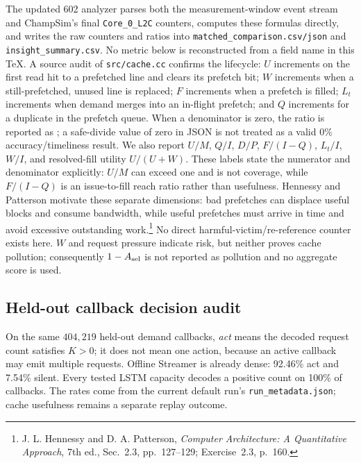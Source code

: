 \documentclass[10pt]{article}
\newcommand{\NA}{\textemdash}
\begin{document}
\begin{infobox}[title={\bfseries Exact interpretation boundaries}]
The updated 602 analyzer parses both the measurement-window event stream and
ChampSim's final \texttt{Core\_0\_L2C} counters, computes these formulas
directly, and writes the raw counters and ratios into
\texttt{matched\_comparison.csv/json} and \texttt{insight\_summary.csv}.
No metric below is reconstructed from a field name in this TeX.  A source
audit of \texttt{src/cache.cc} confirms the lifecycle: $U$ increments on the first read
hit to a prefetched line and clears its prefetch bit; $W$ increments when a
still-prefetched, unused line is replaced; $F$ increments when a prefetch is
filled; $L_t$ increments when demand merges into an in-flight prefetch; and
$Q$ increments for a duplicate in the prefetch queue.  When a denominator is
zero, the ratio is reported as \NA; a safe-divide value of zero in JSON is not
treated as a valid 0\% accuracy/timeliness result.  We also report
$U/M$, $Q/I$, $D/P$, $F/(I-Q)$, $L_t/I$, $W/I$, and resolved-fill
utility $U/(U+W)$.  These labels state the numerator and denominator
explicitly: $U/M$ can exceed one and is not coverage, while $F/(I-Q)$ is an
issue-to-fill reach ratio rather than usefulness.
Hennessy and Patterson motivate these separate dimensions: bad prefetches can
displace useful blocks and consume bandwidth, while useful prefetches must
arrive in time and avoid excessive outstanding work.\footnote{J. L. Hennessy
and D. A. Patterson, \emph{Computer Architecture: A Quantitative Approach},
7th ed., Sec.~2.3, pp.~127--129; Exercise~2.3, p.~160.}
No direct harmful-victim/re-reference counter exists here.  $W$ and request
pressure indicate risk, but neither proves cache pollution; consequently
$1-A_{\rm sel}$ is not reported as pollution and no aggregate score is used.
\end{infobox}

\subsection*{Held-out callback decision audit}
\begin{infobox}[title={\bfseries Dense teacher, always-act student}]
On the same $404{,}219$ held-out demand callbacks, \emph{act} means the decoded
request count satisfies $K>0$; it does not mean one action, because an active
callback may emit multiple requests.  Offline Streamer is already dense:
92.46\% act and 7.54\% silent.  Every tested LSTM capacity decodes a positive
count on 100\% of callbacks.  The rates come from the current default run's
\texttt{run\_metadata.json}; cache usefulness remains a separate replay
outcome.
\end{infobox}
\end{document}
